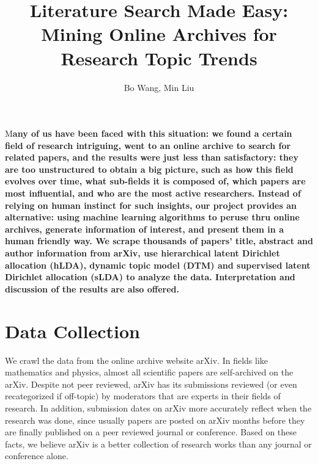 \documentclass[DIV=calc, paper=a4, fontsize=11pt, twocolumn]{scrartcl}	 %
\title{\Huge Literature Search Made Easy: Mining Online Archives for Research Topic Trends} %
\author{Bo Wang, Min Liu } %
\date{} %
\newcommand{\initial}[1]{ %
\lettrine[lines=3,lhang=0.3,nindent=0em]{
\color{DarkGoldenrod}
{\textsf{#1}}}{}}
\begin{document}
\maketitle %

\thispagestyle{fancy} %


\initial{M}\textbf{any of us have been faced with this situation: we found a certain field of research intriguing, went to an online archive to search for related papers, and the results were just less than satisfactory: they are too unstructured to obtain a big picture, such as how this field evolves over time, what sub-fields it is composed of, which papers are most influential, and who are the most active researchers. Instead of relying on human instinct for such insights, our project provides an alternative: using machine learning algorithms to peruse thru online archives, generate information of interest, and present them in a human friendly way. We scrape thousands of papers' title, abstract and author information from arXiv, use hierarchical latent Dirichlet allocation (hLDA), dynamic topic model (DTM) and supervised latent Dirichlet allocation (sLDA) to analyze the data. Interpretation and discussion of the results are also offered.}


\section*{Data Collection}

We crawl the data from the online archive website arXiv. In fields like mathematics and physics, almost all scientific papers are self-archived on the arXiv. Despite not peer reviewed, arXiv has its submissions reviewed (or even recategorized if off-topic) by moderators that are experts in their fields of research. In addition, submission dates on arXiv more accurately reflect when the research was done, since usually papers are posted on arXiv months before they are finally published on a peer reviewed journal or conference. Based on these facts, we believe arXiv is a better collection of research works than any journal or conference alone.
\end{document}
